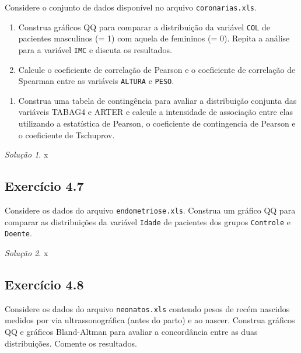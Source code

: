 \documentclass[
]{latex/krantz}
\providecommand{\tightlist}{%
  \setlength{\itemsep}{0pt}\setlength{\parskip}{0pt}}
\theoremstyle{definition}
\theoremstyle{definition}
\theoremstyle{definition}
\theoremstyle{definition}
\theoremstyle{remark}
\newtheorem*{solution}{Solução}
\begin{document}
Considere o conjunto de dados disponível no arquivo \texttt{coronarias.xls}.

\begin{enumerate}
\def\labelenumi{\alph{enumi}.}
\tightlist
\item
  Construa gráficos QQ para comparar a distribuição da variável \texttt{COL} de pacientes masculinos (= 1) com aquela de femininos (= 0). Repita a análise para a variável \texttt{IMC} e discuta os resultados.
\item
  Calcule o coeficiente de correlação de Pearson e o coeficiente de correlação de Spearman entre as variáveis \texttt{ALTURA} e \texttt{PESO}.
\end{enumerate}

\begin{enumerate}
\def\labelenumi{\alph{enumi})}
\setcounter{enumi}{2}
\tightlist
\item
  Construa uma tabela de contingência para avaliar a distribuição conjunta das variáveis TABAG4 e ARTER e calcule a intensidade de associação entre elas utilizando a estatística de Pearson, o coeficiente de contingencia de Pearson e o coeficiente de Tschuprov.
\end{enumerate}

\begin{solution}
x
\end{solution}

\hypertarget{exr4-7}{%
\subsection*{Exercício 4.7}\label{exr4-7}}

Considere os dados do arquivo \texttt{endometriose.xls}. Construa um gráfico QQ para comparar as distribuições da variável \texttt{Idade} de pacientes dos grupos \texttt{Controle} e \texttt{Doente}.

\begin{solution}
x
\end{solution}

\hypertarget{exr4-8}{%
\subsection*{Exercício 4.8}\label{exr4-8}}

Considere os dados do arquivo \texttt{neonatos.xls} contendo pesos de recém nascidos medidos por via ultrassonográfica (antes do parto) e ao nascer. Construa gráficos QQ e gráficos Bland-Altman para avaliar a concordância entre as duas distribuições. Comente os resultados.
\end{document}
